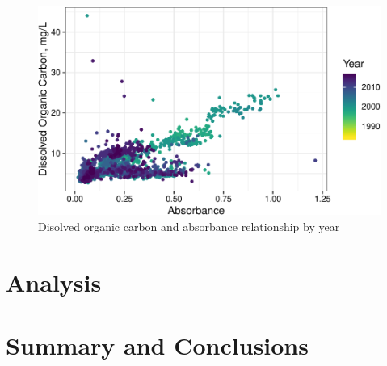 \documentclass[12pt,]{article}
\begin{document}
\begin{figure}
\centering
\includegraphics{Bash_ENV872_Project_files/figure-latex/absorbdoc-1.pdf}
\caption{\label{fig:absorbdoc} Disolved organic carbon and absorbance
relationship by year}
\end{figure}

\newpage

\section{Analysis}\label{analysis}

\newpage

\section{Summary and Conclusions}\label{summary-and-conclusions}
\end{document}
